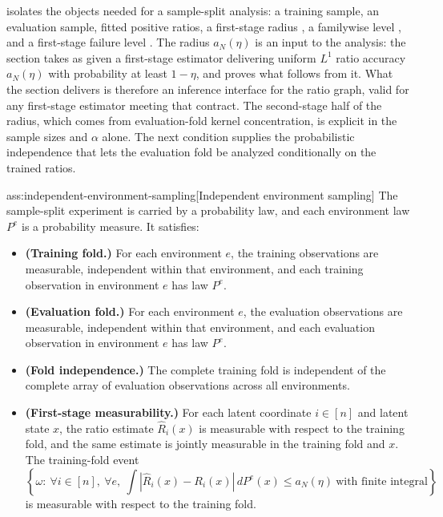  isolates the objects needed for a sample-split analysis: a training sample, an evaluation sample, fitted positive ratios, a first-stage radius , a familywise level , and a first-stage failure level . The radius \(a_N(\eta)\) is an input to the analysis: the section takes as given a first-stage estimator delivering uniform \(L^1\) ratio accuracy \(a_N(\eta)\) with probability at least \(1-\eta\), and proves what follows from it. What the section delivers is therefore an inference interface for the ratio graph, valid for any first-stage estimator meeting that contract. The second-stage half of the radius, which comes from evaluation-fold kernel concentration, is explicit in the sample sizes and \(\alpha\) alone. The next condition supplies the probabilistic independence that lets the evaluation fold be analyzed conditionally on the trained ratios.

\begin{assumptionv}{ass:independent-environment-sampling}[Independent environment sampling]
The sample-split experiment is carried by a probability law, and each environment law \(P^e\) is a probability measure. It satisfies:
\begin{itemize}
\item \textbf{(Training fold.)} For each environment \(e\), the training observations are measurable, independent within that environment, and each training observation in environment \(e\) has law \(P^e\).
\item \textbf{(Evaluation fold.)} For each environment \(e\), the evaluation observations are measurable, independent within that environment, and each evaluation observation in environment \(e\) has law \(P^e\).
\item \textbf{(Fold independence.)} The complete training fold is independent of the complete array of evaluation observations across all environments.
\item \textbf{(First-stage measurability.)} For each latent coordinate \(i\in[n]\) and latent state \(x\), the ratio estimate \(\widehat R_i(x)\) is measurable with respect to the training fold, and the same estimate is jointly measurable in the training fold and \(x\). The training-fold event
\[
\left\{\omega:\ \forall i\in[n],\ \forall e,\ 
\int \left|\widehat R_i(x)-R_i(x)\right|\,dP^e(x)\le a_N(\eta)
\ \text{with finite integral}\right\}
\]
is measurable with respect to the training fold.
\end{itemize}
\end{assumptionv}

